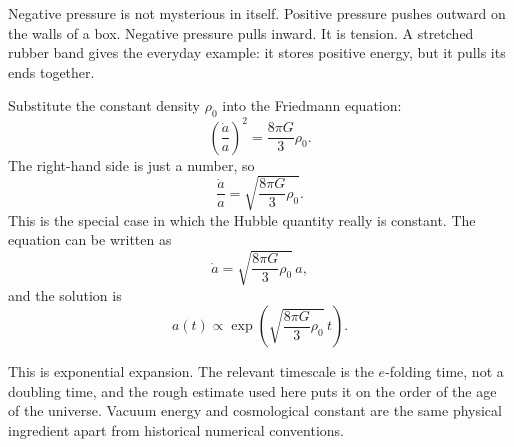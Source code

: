 Negative pressure is not mysterious in itself. Positive pressure pushes outward on the walls of a box. Negative pressure pulls inward. It is tension. A stretched rubber band gives the everyday example: it stores positive energy, but it pulls its ends together.

Substitute the constant density \(\rho_0\) into the Friedmann equation:
\begin{equation}
\left(\frac{\dot a}{a}\right)^2=\frac{8\pi G}{3}\rho_0.
\end{equation}
The right-hand side is just a number, so
\begin{equation}
\frac{\dot a}{a}=\sqrt{\frac{8\pi G}{3}\rho_0}.
\end{equation}
This is the special case in which the Hubble quantity really is constant. The equation can be written as
\begin{equation}
\dot a=\sqrt{\frac{8\pi G}{3}\rho_0}\,a,
\end{equation}
and the solution is
\begin{equation}
a(t)\propto \exp\!\left(\sqrt{\frac{8\pi G}{3}\rho_0}\,t\right).
\end{equation}

This is exponential expansion. The relevant timescale is the \(e\)-folding time, not a doubling time, and the rough estimate used here puts it on the order of the age of the universe. Vacuum energy and cosmological constant are the same physical ingredient apart from historical numerical conventions.

\begin{classroomqa}
\end{classroomqa}

\begin{classroomqa}
\end{classroomqa}

